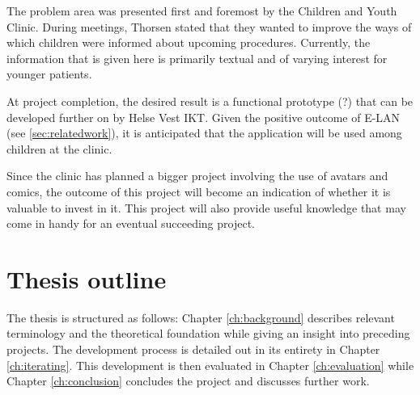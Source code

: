 The problem area was presented first and foremost by the Children and Youth Clinic. During meetings, Thorsen stated that they wanted to improve the ways of which children were informed about upcoming procedures. Currently, the information that is given here is primarily textual and of varying interest for younger patients.

At project completion, the desired result is a functional prototype (?) that can be developed further on by Helse Vest IKT. Given the positive outcome of E-LAN (see \ref{sec:relatedwork}), it is anticipated that the application will be used among children at the clinic.


Since the clinic has planned a bigger project involving the use of avatars and comics, the outcome of this project will become an indication of whether it is valuable to invest in it. This project will also provide useful knowledge that may come in handy for an eventual succeeding project.

\section{Thesis outline}

The thesis is structured as follows: Chapter \ref{ch:background} describes relevant terminology and the theoretical foundation while giving an insight into preceding projects. The development process is detailed out in its entirety in Chapter \ref{ch:iterating}. This development is then evaluated in Chapter \ref{ch:evaluation} while Chapter \ref{ch:conclusion} concludes the project and discusses further work.
